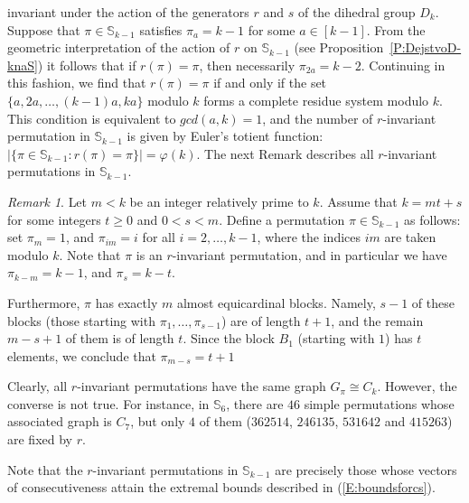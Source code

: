 \documentclass{birkjour}
\theoremstyle{definition}
\theoremstyle{remark}
\newtheorem{rem}[thm]{Remark}
\numberwithin{equation}{section}
\begin{document}
invariant under the action of the generators $r$ and $s$ of the
dihedral group $D_k$. Suppose that $\pi\in \mathbb{S}_{k-1}$
satisfies $\pi_a=k-1$ for some $a\in [k-1]$. From the geometric
interpretation of the action of $r$ on $\mathbb{S}_{k-1}$ (see
Proposition~\ref{P:DejstvoD-knaS}) it follows that if
$r(\pi)=\pi$, then necessarily $\pi_{2a}=k-2$. Continuing in this
fashion, we find that $r(\pi)=\pi$ if and only if the set
$\{a,2a,\ldots,(k-1)a,ka\}$ modulo $k$ forms a complete residue
system modulo $k$. This condition is equivalent to $gcd(a,k)=1$,
and the number of $r$-invariant permutation in $\mathbb{S}_{k-1}$
is given by Euler's totient function: $|\{\pi\in
\mathbb{S}_{k-1}:r(\pi)=\pi\}|=\varphi(k)$. The next Remark
describes all $r$-invariant permutations in $\mathbb{S}_{k-1}$.

\begin{rem}\label{R:Blocks}
\label{P:blocksinr-invariant} Let $m<k$ be an integer relatively
prime to $k$. Assume that $k=mt+s$ for some integers $t \geq 0$
and $0<s<m$. Define a permutation $\pi \in \mathbb{S}_{k-1}$ as
follows: set $\pi_m=1$, and $\pi_{im}=i$ for all $i = 2, \ldots, k
- 1$, where the indices $im$ are taken modulo $k$. Note that $\pi$
is an $r$-invariant permutation, and in particular we have
$\pi_{k-m}=k-1$, and $\pi_s=k-t$.

Furthermore, $\pi$ has exactly $m$ almost equicardinal blocks.
Namely, $s-1$ of these blocks (those starting with
$\pi_1,\ldots,\pi_{s-1}$) are of length $t+1$, and the remain
$m-s+1$ of them is of length $t$. Since the block $B_1$ (starting
with $1$) has $t$ elements, we conclude that $\pi_{m-s}=t+1$
\end{rem}



 Clearly, all
$r$-invariant permutations have the same graph $G_\pi\cong C_k$.
However, the converse is not true. For instance, in
$\mathbb{S}_6$, there are $46$ simple permutations whose
associated graph is $C_7$, but only $4$ of them ($362514$,
$246135$, $ 531642$ and $415263$) are fixed by $r$.

Note that the $r$-invariant permutations in $\mathbb{S}_{k-1}$ are
precisely those whose vectors of consecutiveness attain the
extremal bounds described in (\ref{E:boundsforcs}).
\end{document}
